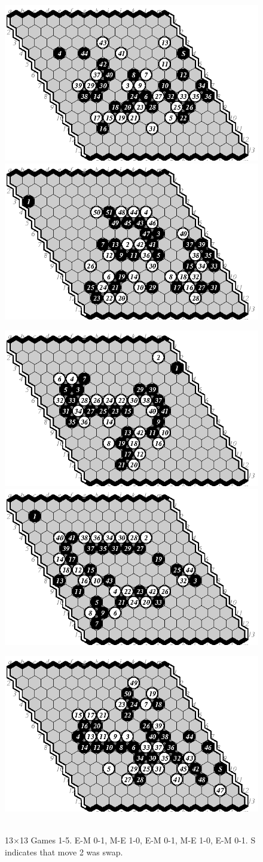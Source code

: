 \documentclass{IOS-Book-Article}
\begin{document}
\begin{figure}
\noindent\includegraphics[width=.58\columnwidth]{pix/01-e-m}\hspace*{-.14\columnwidth}\includegraphics[width=.58\columnwidth]{pix/02-m-e}
\vspace*{.2cm}

\noindent\includegraphics[width=.58\columnwidth]{pix/03-e-m}\hspace*{-.14\columnwidth}\includegraphics[width=.58\columnwidth]{pix/04-m-e}
\vspace*{.2cm}

\noindent\hfill\includegraphics[width=.58\columnwidth]{pix/05-e-m}\hfill\ 
\caption{13$\times$13 Games 1-5. E-M 0-1, M-E 1-0, E-M 0-1, M-E 1-0, E-M 0-1.
S indicates that move 2 was swap.}
\label{fig:13}
\end{figure}
\end{document}
